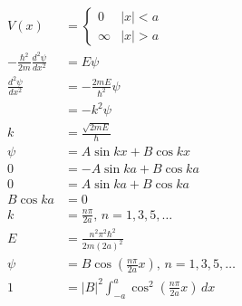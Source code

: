 \documentclass{article}
\begin{document}
\begin{align*}
  V(x)                                        & = \begin{cases}
                                                    0      & |x| < a \\
                                                    \infty & |x| > a
                                                  \end{cases}                                                                  \\
  -\frac{\hbar^2}{2 m} \frac{d^2 \psi}{d x^2} & = E \psi                                                                            \\
  \frac{d^2 \psi}{d x^2}                      & = -\frac{2 m E}{\hbar^2} \psi                                                       \\
                                              & = -k^2 \psi                                                                         \\
  k                                           & = \frac{\sqrt{2 m E}}{\hbar}                                                        \\
  \psi                                        & = A \sin k x + B \cos k x                                                           \\
  0                                           & = -A \sin k a + B \cos k a                                                          \\
  0                                           & = A \sin k a + B \cos k a                                                           \\
  B \cos k a                                  & = 0                                                                                 \\
  k                                           & = \frac{n \pi}{2 a}, \,n = 1, 3, 5, \ldots                                          \\
  E                                           & = \frac{n^2 \pi^2 \hbar^2}{2 m (2 a)^2}                                             \\
  \psi                                        & = B \cos \left( \frac{n \pi}{2 a} x \right), \,n = 1, 3, 5, \ldots                  \\
  1                                           & = |B|^2\int_{-a}^a \cos^2 \left( \frac{n \pi}{2 a} x \right) \,d x                  \\

\end{align*}
\end{document}
